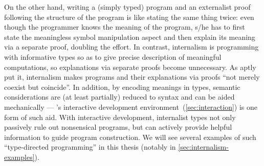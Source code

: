 On the other hand, writing a (simply typed) program and an externalist proof following the structure of the program is like stating the same thing twice: even though the programmer knows the meaning of the program, s/he has to first state the meaningless symbol manipulation aspect and then explain its meaning via a separate proof, doubling the effort.
In contrast, internalism is programming with informative types so as to give precise description of meaningful computations, so explanations via separate proofs become unnecessary.
As \citet{McBride-Epigram} aptly put it, internalism makes programs and their explanations via proofs ``not merely coexist but coincide''.
In addition, by encoding meanings in types, semantic considerations are (at least partially) reduced to syntax and can be aided mechanically --- \Agda's interactive development environment~(\autoref{sec:interaction}) is one form of such aid.
With interactive development, internalist types not only passively rule out nonsensical programs, but can actively provide helpful information to guide program construction.
We will see several examples of such ``type-directed programming'' in this thesis (notably in \autoref{sec:internalism-examples}).


